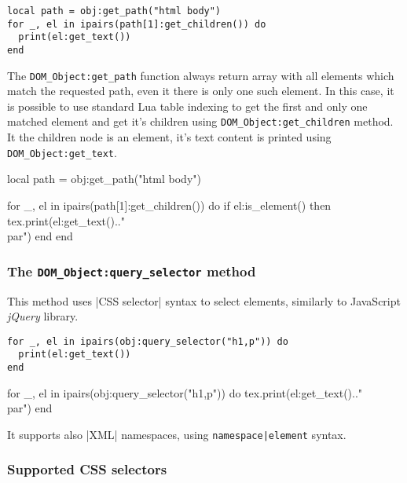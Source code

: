 \documentclass{ltxdoc}
\begin{document}
\begin{verbatim}
local path = obj:get_path("html body")
for _, el in ipairs(path[1]:get_children()) do
  print(el:get_text())
end
\end{verbatim}

The \verb|DOM_Object:get_path| function always return array with all elements
which match the requested path, even it there is only one such element. In this
case, it is possible to use standard Lua table indexing to get the first and
only one matched element and get it's children using
\verb|DOM_Object:get_children| method. It the children node is an element, it's
text content is printed using \verb|DOM_Object:get_text|.



\begin{framed}
  \begin{luacode*}
local path = obj:get_path("html body")

for _, el in ipairs(path[1]:get_children()) do
  if el:is_element() then
    tex.print(el:get_text().."\\par")
  end
end
  \end{luacode*}
\end{framed}

\subsubsection{The \texttt{DOM\_Object:query\_selector} method}

This method uses |CSS selector| syntax to select elements, similarly to JavaScript \textit{jQuery} library.

\begin{verbatim}
for _, el in ipairs(obj:query_selector("h1,p")) do
  print(el:get_text())
end
\end{verbatim}


\begin{framed}
  \begin{luacode*}
for _, el in ipairs(obj:query_selector("h1,p")) do
  tex.print(el:get_text().."\\par")
end
  \end{luacode*}
\end{framed}

It supports also |XML| namespaces, using \verb_namespace|element_ syntax.

\subsubsection{Supported CSS selectors}
\end{document}
